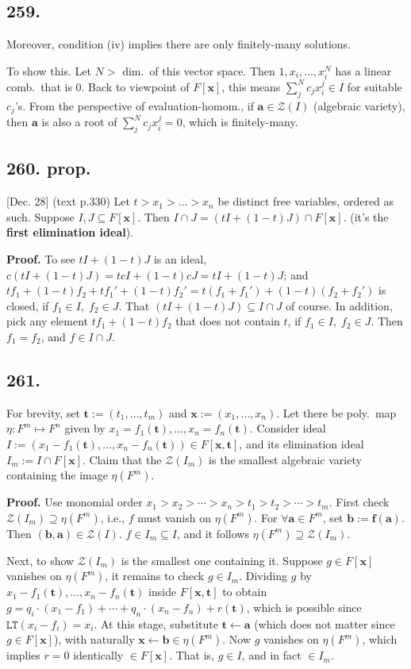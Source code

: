 \documentclass[12pt]{article}
\newcommand{\M}\cdot%
\newcommand{\V}\mathbf%
\newcommand{\Ev}\forall%
\newcommand{\SF}[1]{ \mathscr{#1} }%
\newcommand{\Ss}[1]{\textsf{\bfseries{#1}}}%
\newcommand{\Tw}[1]{\texttt{#1}}%
\begin{document}
\subsection*{259.} Moreover, condition (iv) implies there are only finitely-many solutions. \par
To show this. Let \(N >\) dim.\ of this vector space. 
Then \(1,x_i,\dotsc,x_i^N\) has a linear comb.\ that is 0. 
Back to viewpoint of \(F[\V{x}]\), this means \(\sum_j^N c_j x_i^j \in I\) for suitable \(c_j\)'s. 
From the perspective of evaluation-homom., if \(\V{a} \in \SF{Z}(I)\) (algebraic variety), then \(\V{a}\) is also a root of \(\sum_j^N c_j x_i^j =0\), which is finitely-many. 

\subsection*{260. prop.} [Dec. 28] (text p.330) Let \(t >x_1 >\dotsc >x_n\) be distinct free variables, ordered as such. 
Suppose \(I,J \subseteq F[\V{x}]\). 
Then \(I \cap J =(tI +(1-t)J) \cap F[\V{x}]\). (it's the \Ss{first elimination ideal}). \par
\Ss{Proof.} To see \(tI +(1-t)J\) is an ideal, \(c(tI +(1-t)J) =tcI +(1-t)cJ =tI +(1-t)J\); and \(tf_1 +(1-t)f_2 +tf_1' +(1-t)f_2' =t(f_1+f_1') +(1-t)(f_2+f_2')\) is closed, if \(f_1 \in I,\; f_2 \in J\). 
That \((tI +(1-t)J) \subseteq I \cap J\) of course. 
In addition, pick any element \(tf_1 +(1-t)f_2\) that does not contain \(t\), if \(f_1 \in I,\; f_2 \in J\). 
Then \(f_1 =f_2\), and \(f \in I \cap J\). 

\subsection*{261.} For brevity, set \(\V{t} :=(t_1,\dotsc,t_m)\) and \(\V{x} :=(x_1,\dotsc,x_n)\). 
Let there be poly.\ map \(\eta: F^m \mapsto F^n\) given by \(x_1 =f_1(\V{t}),\dotsc, x_n =f_n(\V{t})\). 
Consider ideal \(I :=(x_1 -f_1(\V{t}),\dotsc,x_n -f_n(\V{t})) \in F[\V{x},\V{t}]\), and its elimination ideal \(I_m := I \cap F[\V{x}]\). 
Claim that the \(\SF{Z}(I_m)\) is the smallest algebraic variety containing the image \(\eta(F^m)\). \par
\Ss{Proof.} Use monomial order \(x_1 >x_2 >\dotsb >x_n >t_1 >t_2 >\dotsb >t_m\). 
First check \(\SF{Z}(I_m) \supseteq \eta(F^m)\), i.e., \(f\) must vanish on \(\eta(F^m)\). 
For \(\Ev \V{a} \in F^m\), set \(\V{b} := \V{f}(\V{a})\). 
Then \((\V{b},\V{a}) \in \SF{Z}(I)\). 
\(f \in I_m \subseteq I\), and it follows \(\eta(F^m) \supseteq \SF{Z}(I_m)\). \par
Next, to show \(\SF{Z}(I_m)\) is the smallest one containing it. 
Suppose \(g \in F[\V{x}]\) vanishes on \(\eta(F^m)\), it remains to check \(g \in I_m\). 
Dividing \(g\) by \(x_1 -f_1(\V{t}),\dotsc,x_n -f_n(\V{t})\) inside \(F[\V{x},\V{t}]\) to obtain \(g =q_i \M (x_1-f_1) +\dotsb+ q_n \M (x_n-f_n) +r(\V{t})\), which is possible since \(\Tw{LT}(x_i-f_i) =x_i\). 
At this stage, substitute \(\V{t} \leftarrow \V{a}\) (which does not matter since \(g \in F[\V{x}]\)), with naturally \(\V{x} \leftarrow \V{b} \in \eta(F^m)\). 
Now \(g\) vanishes on \(\eta(F^m)\), which implies \(r=0\) identically \(\in F[\V{x}]\). 
That is, \(g \in I\), and in fact \(\in I_m\). 
\end{document}
